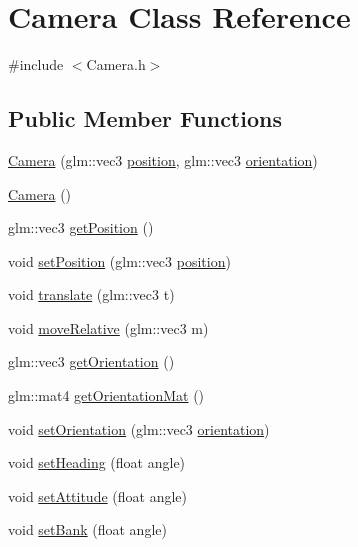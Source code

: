 \hypertarget{class_camera}{}\section{Camera Class Reference}
\label{class_camera}


{\ttfamily \#include $<$Camera.\+h$>$}

\subsection*{Public Member Functions}
\begin{DoxyCompactItemize}
\item 
\hyperlink{class_camera_a68ef089f4eedcfbae2bdfcad31367124}{Camera} (glm\+::vec3 \hyperlink{class_camera_a04b5db2c530d8630660e8cfb93a4b3b5}{position}, glm\+::vec3 \hyperlink{class_camera_a1be00c1e1049e3f682094be8d85060a8}{orientation})
\item 
\hyperlink{class_camera_a01f94c3543f56ede7af49dc778f19331}{Camera} ()
\item 
glm\+::vec3 \hyperlink{class_camera_a520c5a7413b3e704f2f442288db17bcf}{get\+Position} ()
\item 
void \hyperlink{class_camera_abe8633adb8475cb7c62e1a12743a1025}{set\+Position} (glm\+::vec3 \hyperlink{class_camera_a04b5db2c530d8630660e8cfb93a4b3b5}{position})
\item 
void \hyperlink{class_camera_a8c60b4783ba52788407db8b7288340d8}{translate} (glm\+::vec3 t)
\item 
void \hyperlink{class_camera_a273e57a23eff6fc19c874e6b3f55815d}{move\+Relative} (glm\+::vec3 m)
\item 
glm\+::vec3 \hyperlink{class_camera_a8342c02ba4a61ed967c6c63525553148}{get\+Orientation} ()
\item 
glm\+::mat4 \hyperlink{class_camera_aa1f56868dc6c575f0a81e3ef6ce3743c}{get\+Orientation\+Mat} ()
\item 
void \hyperlink{class_camera_a481b95946689f4a1f33c666e9647f4ce}{set\+Orientation} (glm\+::vec3 \hyperlink{class_camera_a1be00c1e1049e3f682094be8d85060a8}{orientation})
\item 
void \hyperlink{class_camera_a444cef4d5ea1dcf192dd3280f23b39c9}{set\+Heading} (float angle)
\item 
void \hyperlink{class_camera_a7f61f7b731c8d7773c4c72b34ab4d9dc}{set\+Attitude} (float angle)
\item 
void \hyperlink{class_camera_af7293d15bf9c29c10b07fdb88eb6b9bb}{set\+Bank} (float angle)
\item 

\end{DoxyCompactItemize}
